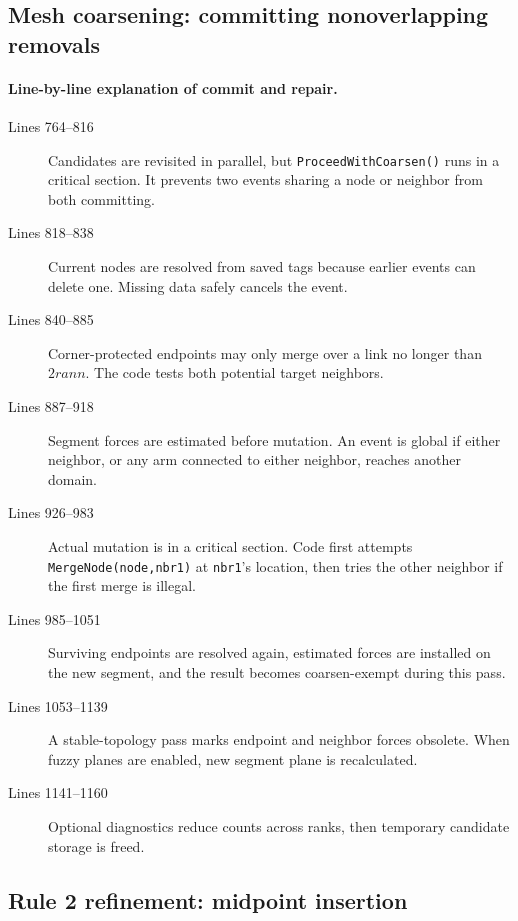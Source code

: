 \documentclass[11pt]{article}
\newcommand{\code}[1]{\texorpdfstring{\nolinkurl{#1}}{#1}}
\begin{document}
\subsection{Mesh coarsening: committing nonoverlapping removals}





\paragraph{Line-by-line explanation of commit and repair.}
\begin{description}
\item[Lines 764--816] Candidates are revisited in parallel, but
\code{ProceedWithCoarsen()} runs in a critical section. It prevents two
events sharing a node or neighbor from both committing.
\item[Lines 818--838] Current nodes are resolved from saved tags because
earlier events can delete one. Missing data safely cancels the event.
\item[Lines 840--885] Corner-protected endpoints may only merge over a link
no longer than \(2rann\). The code tests both potential target neighbors.
\item[Lines 887--918] Segment forces are estimated before mutation. An event
is global if either neighbor, or any arm connected to either neighbor, reaches
another domain.
\item[Lines 926--983] Actual mutation is in a critical section. Code first
attempts \code{MergeNode(node,nbr1)} at \code{nbr1}'s location, then tries
the other neighbor if the first merge is illegal.
\item[Lines 985--1051] Surviving endpoints are resolved again, estimated
forces are installed on the new segment, and the result becomes
coarsen-exempt during this pass.
\item[Lines 1053--1139] A stable-topology pass marks endpoint and neighbor
forces obsolete. When fuzzy planes are enabled, new segment plane is
recalculated.
\item[Lines 1141--1160] Optional diagnostics reduce counts across ranks,
then temporary candidate storage is freed.
\end{description}

\subsection{Rule 2 refinement: midpoint insertion}
\end{document}
